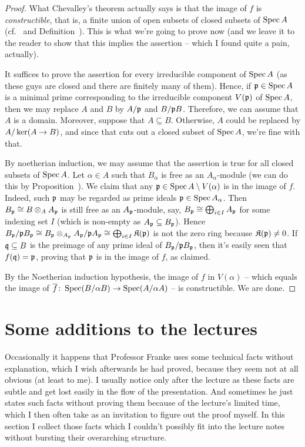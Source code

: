 \documentclass[a4paper,parskip=half,numbers=enddot, DIV=12]{scrreprt}
\begin{document}
\begin{proof}
	What Chevalley's theorem actually says is that the image of $f$ is \emph{constructible}, that is, a finite union of open subsets of closed subsets of $\operatorname{Spec} A$ (cf.\ \cite[Corollary~14.6]{eisenbudCommAlg} and Definition~). This is what we're going to prove now (and we leave it to the reader to show that this implies the assertion -- which I found quite a pain, actually).
	
	It suffices to prove the assertion for every irreducible component of $\operatorname{Spec} A$ (as these guys are closed and there are finitely many of them). Hence, if $\mathfrak{p}\in\operatorname{Spec} A$ is a minimal prime corresponding to the irreducible component $V(\mathfrak{p})$ of $\operatorname{Spec} A$, then we may replace $A$ and $B$ by $A/\mathfrak{p}$ and $B/\mathfrak{p} B$. Therefore, we can assume that $A$ is a domain. Moreover, suppose that $A\subseteq B$. Otherwise, $A$ could be replaced by $A/\ker(A\morphism B)$, and since that cuts out a closed subset of $\operatorname{Spec} A$, we're fine with that. 
	
	By noetherian induction, we may assume that the assertion is true for all closed subsets of $\operatorname{Spec} A$. Let $\alpha\in A$ such that $B_\alpha$ is free as an $A_\alpha$-module (we can do this by Proposition~). We claim that any $\mathfrak{p}\in\operatorname{Spec} A\setminus V(\alpha)$ is in the image of $f$. Indeed, such $\mathfrak{p}$ may be regarded as prime ideals $\mathfrak{p}\in\operatorname{Spec} A_\alpha$. Then $B_{\mathfrak{p}}\cong B\otimes_AA_{\mathfrak{p}}$ is still free as an $A_{\mathfrak{p}}$-module, say, $B_{\mathfrak{p}}\cong \bigoplus_{i\in I}A_{\mathfrak{p}}$ for some indexing set $I$ (which is non-empty as $A_{\mathfrak{p}}\subseteq B_{\mathfrak{p}}$). Hence $B_{\mathfrak{p}}/\mathfrak{p} B_{\mathfrak{p}}\cong B_{\mathfrak{p}}\otimes_{A_{\mathfrak{p}}}A_{\mathfrak{p}}/\mathfrak{p} A_{\mathfrak{p}}\cong \bigoplus_{i\in I}\mathfrak{K}(\mathfrak{p})$ is not the zero ring because $\mathfrak{K}(\mathfrak{p})\neq 0$. If $\mathfrak{q}\subseteq B$ is the preimage of any prime ideal of $B_{\mathfrak{p}}/\mathfrak{p} B_{\mathfrak{p}}$, then it's easily seen that $f(\mathfrak{q})=\mathfrak{p}$, proving that $\mathfrak{p}$ is in the image of $f$, as claimed.
	
	By the Noetherian induction hypothesis, the image of $f$ in $V(\alpha)$ -- which equals the image of $\ov{f}\colon\Spec(B/\alpha B)\morphism\Spec (A/\alpha A)$ -- is constructible. We are done.		
\end{proof}
\section{Some additions to the lectures}
Occasionally it happens that Professor Franke uses some technical facts without explanation, which I wish afterwards he had proved, because they seem not at all obvious (at least to me). I usually notice only after the lecture as these facts are subtle and get lost easily in the flow of the presentation. And sometimes he just states such facts without proving them because of the lecture's limited time, which I then often take as an invitation to figure out the proof myself. In this section I collect those facts which I couldn't possibly fit into the lecture notes without bursting their overarching structure.
\end{document}
